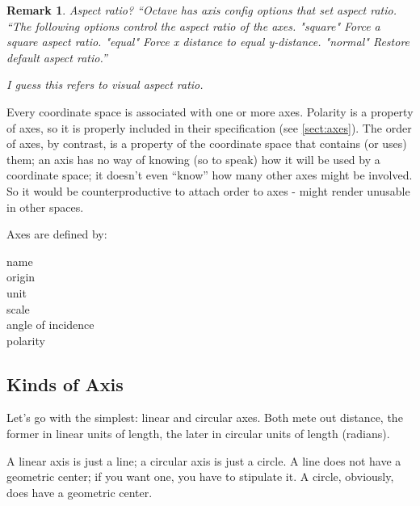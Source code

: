 \documentclass[12pt]{tufte-handout}
\numberwithin{equation}{subsection}
\numberwithin{equation}{subsection}
\newtheorem{remark}{Remark}
\newcommand\cspace{coordinate space}
\begin{document}
  \begin{remark}
    Aspect ratio?  ``Octave has axis config options that set aspect
    ratio.  ``The following options control the aspect ratio of the
    axes.  "square" Force a square aspect ratio.  "equal" Force x
    distance to equal y-distance.  "normal" Restore default aspect
    ratio.''

    I guess this refers to visual aspect ratio.
  \end{remark}

  Every \cspace{} is associated with one or more axes.  Polarity is a
  property of axes, so it is properly included in their specification
  (see \ref{sect:axes}).  The order of axes, by contrast, is a
  property of the \cspace{} that contains (or uses) them; an axis has
  no way of knowing (so to speak) how it will be used by a \cspace; it
  doesn't even ``know'' how many other axes might be involved.  So it
  would be counterproductive to attach order to axes - might render
  unusable in other spaces.

  Axes are defined by:

  \begin{description}
  \item [name]
  \item [origin]
  \item [unit]
  \item [scale]
  \item [angle of incidence]
  \item [polarity]
  \end{description}

  \subsection{Kinds of Axis}

  Let's go with the simplest: linear and circular axes.  Both mete
  out distance, the former in linear units of length, the later in
  circular units of length (radians).

  A linear axis is just a line; a circular axis is just a circle.  A
  line does not have a geometric center; if you want one, you have
  to stipulate it.  A circle, obviously, does have a geometric
  center.
\end{document}
